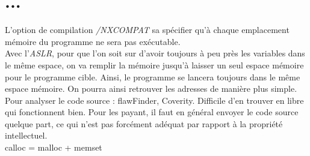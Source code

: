 \section{...}
L'option de compilation \textit{/NXCOMPAT} sa spécifier qu'à chaque emplacement mémoire du programme ne sera pas exécutable.\\
Avec l'\textit{ASLR}, pour que l'on soit sur d'avoir toujours à peu près les variables dans le même espace, on va remplir la mémoire jusqu'à laisser un seul espace mémoire pour le programme cible. Ainsi, le programme se lancera toujours dans le même espace mémoire. On pourra ainsi retrouver les adresses de manière plus simple.\\
Pour analyser le code source : flawFinder, Coverity. Difficile d'en trouver en libre qui fonctionnent bien. Pour les payant, il faut en général envoyer le code source quelque part, ce qui n'est pas forcément adéquat par rapport à la propriété intellectuel.\\
calloc = malloc + memset\\
